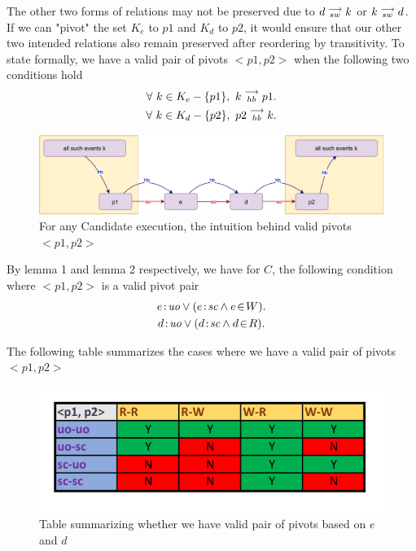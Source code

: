     The other two forms of relations may not be preserved due to $d\stackrel{\longrightarrow}{_{sw}}k$ or $k\stackrel{\longrightarrow}{_{sw}}d$. If we can "pivot" the  set $K_e$ to $p1$ and $K_d$ to $p2$, it would ensure that our other two intended relations also remain preserved after reordering by transitivity. To state formally, we have a valid pair of pivots $<p1,p2>$ when the following two conditions hold
    \begin{gather*}
        \forall \ k \in K_e - \{p1\}, \ k\stackrel{\longrightarrow}{_{hb}}p1. \\
        \forall \ k \in K_d - \{p2\}, \ p2\stackrel{\longrightarrow}{_{hb}}k.
    \end{gather*}
    
    \begin{figure}[H]
        \centering
        \includegraphics[scale=0.7]{InstructionReordering/ValidReorderingProof/ProofParts/Part1/part1(d).pdf}
        \caption{For any Candidate execution, the intuition behind valid pivots $<p1,p2>$}
        \label{fig:my_label}
    \end{figure}
    
    By lemma 1 and lemma 2 respectively, we have for $C$, the following condition where $<p1, p2>$ is a valid pivot pair
    \begin{gather*}
        \et{e}{uo} \vee (\et{e}{sc} \wedge \event{e}{W}). \\
        \et{d}{uo} \vee (\et{d}{sc} \wedge \event{d}{R}).
    \end{gather*}
        
    The following table summarizes the cases where we have a valid pair of pivots $<p1,p2>$
    \begin{figure}[H]
        \centering
        \includegraphics[scale=0.7]{InstructionReordering/ValidReorderingProof/ProofParts/Part1/part1_table.pdf}
        \caption{Table summarizing whether we have valid pair of pivots based on  $e$ and $d$}
        \label{fig:my_label}
    \end{figure}
            
